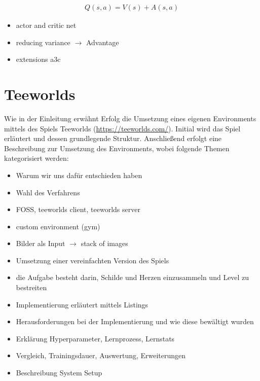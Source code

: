 \documentclass[11pt]{scrartcl}
\begin{document}
\begin{align}
Q(s,a)=V(s)+A(s,a)
\label{aln:actor-critic-advantage}
\end{align}



\begin{itemize}
\itemsep0pt
\item actor and critic net
\item reducing variance $\rightarrow$ Advantage
\item extensions a3c
\end{itemize}

\newpage
\section{Teeworlds}
Wie in der Einleitung erwähnt Erfolg die Umsetzung eines eigenen Environments mittels des
Spiels Teeworlds (\url{https://teeworlds.com/}). Initial wird das Spiel erläutert und
dessen grundlegende Struktur. Anschließend erfolgt eine Beschreibung zur Umsetzung des
Environments, wobei folgende Themen kategorisiert werden:
\begin{itemize}
\itemsep0pt	
\item Warum wir uns dafür entschieden haben
\item Wahl des Verfahrens
\item FOSS, teeworlds client, teeworlds server
\item custom environment (gym)
\item Bilder als Input $\rightarrow$ stack of images
\item Umsetzung einer vereinfachten Version des Spiels
\item die Aufgabe besteht darin, Schilde und Herzen einzusammeln und Level zu bestreiten
\item Implementierung erläutert mittels Listings
\item Herausforderungen bei der Implementierung und wie diese bewältigt wurden
\item Erklärung Hyperparameter, Lernprozess, Lernstats
\item Vergleich, Trainingsdauer, Auswertung, Erweiterungen
\item Beschreibung System Setup
\end{itemize}

\newpage
%


\newpage
\listoffigures 
\listoftables 
\end{document}
